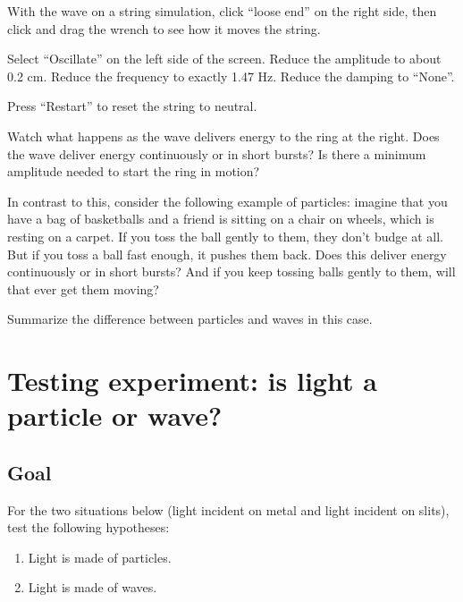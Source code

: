 \begin{steps}
	\item With the wave on a string simulation, click ``loose end'' on the right side, then click and drag the wrench to see how it moves the string.
	
	\item Select ``Oscillate'' on the left side of the screen. Reduce the amplitude to about 0.2 cm. Reduce the frequency to exactly 1.47 Hz. Reduce the damping to ``None''.
	
	\item Press ``Restart'' to reset the string to neutral.
	
	\item Watch what happens as the wave delivers energy to the ring at the right. Does the wave deliver energy continuously or in short bursts? Is there a minimum amplitude needed to start the ring in motion?
	
	\item In contrast to this, consider the following example of particles: imagine that you have a bag of basketballs and a friend is sitting on a chair on wheels, which is resting on a carpet. If you toss the ball gently to them, they don't budge at all. But if you toss a ball fast enough, it pushes them back. Does this deliver energy continuously or in short bursts? And if you keep tossing balls gently to them, will that ever get them moving?

	\item Summarize the difference between particles and waves in this case.

\end{steps}

\section{Testing experiment: is light a particle or wave?}

\subsection{Goal}

For the two situations below (light incident on metal and light incident on slits), test the following hypotheses:
\begin{enumerate}[label=(\Alph*)]
	\item\label{lpw:hyp:part} Light is made of particles.
	\item\label{lpw:hyp:wave} Light is made of waves.
\end{enumerate}

